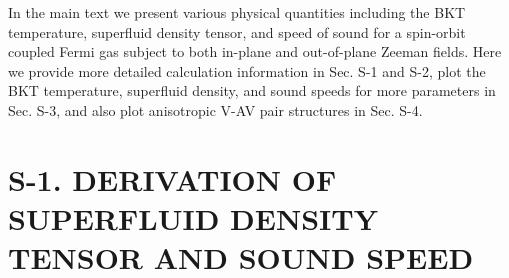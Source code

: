 \documentclass[prl,aps,twocolumn,showpacs, floatfix]{revtex4}
\begin{document}
\begin{widetext}
\maketitle
\setcounter{equation}{0} \setcounter{figure}{0} \setcounter{table}{0} %
\renewcommand{\theequation}{S\arabic{equation}} \renewcommand{\thefigure}{S%
\arabic{figure}} \renewcommand{\bibnumfmt}[1]{[S#1]} \renewcommand{%
\citenumfont}[1]{S#1}

In the main text we present various physical quantities
including the BKT temperature, superfluid density tensor, and speed of sound
for a spin-orbit coupled Fermi gas subject to both in-plane and out-of-plane
Zeeman fields. Here we provide more detailed calculation information in Sec.
S-1 and S-2, plot the BKT temperature, superfluid density, and sound speeds
for more parameters in Sec. S-3, and also plot anisotropic V-AV pair structures in Sec. S-4.

\section{S-1. DERIVATION OF SUPERFLUID DENSITY TENSOR AND SOUND SPEED}


\end{widetext}
\end{document}
